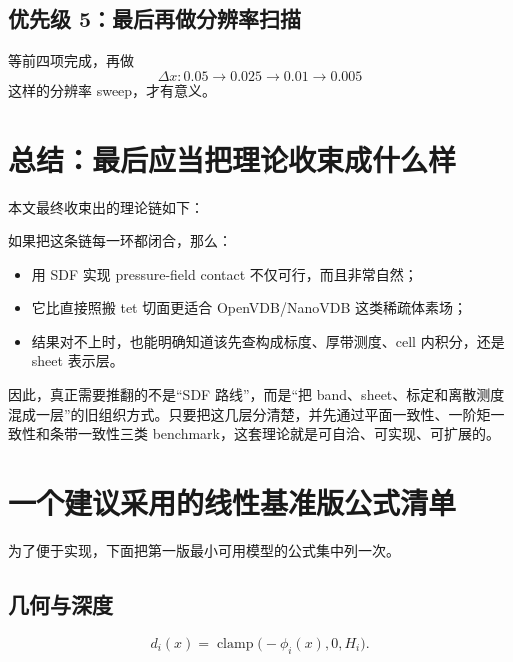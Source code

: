 \documentclass[12pt,a4paper]{ctexart}
\begin{document}
\subsection{优先级 5：最后再做分辨率扫描}
等前四项完成，再做
\begin{equation}
    \Delta x: 0.05 \to 0.025 \to 0.01 \to 0.005
\end{equation}
这样的分辨率 sweep，才有意义。

\section{总结：最后应当把理论收束成什么样}

本文最终收束出的理论链如下：
\begin{center}
\end{center}

如果把这条链每一环都闭合，那么：
\begin{itemize}
    \item 用 SDF 实现 pressure-field contact 不仅可行，而且非常自然；
    \item 它比直接照搬 tet 切面更适合 OpenVDB/NanoVDB 这类稀疏体素场；
    \item 结果对不上时，也能明确知道该先查构成标度、厚带测度、cell 内积分，还是 sheet 表示层。
\end{itemize}

因此，真正需要推翻的不是“SDF 路线”，而是“把 band、sheet、标定和离散测度混成一层”的旧组织方式。只要把这几层分清楚，并先通过平面一致性、一阶矩一致性和条带一致性三类 benchmark，这套理论就是可自洽、可实现、可扩展的。

\appendix
\section{一个建议采用的线性基准版公式清单}

为了便于实现，下面把第一版最小可用模型的公式集中列一次。

\subsection*{几何与深度}
\begin{equation}
    d_i(x)=\operatorname{clamp}\bigl(-\phi_i(x),0,H_i\bigr).
\end{equation}
\end{document}
